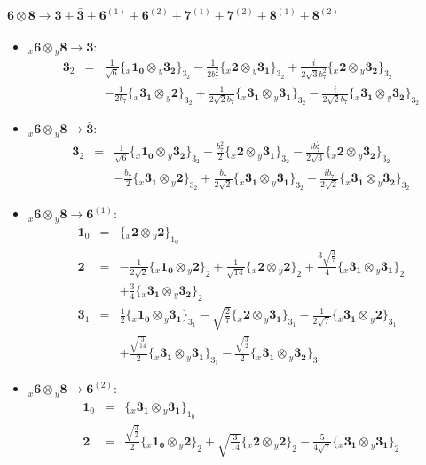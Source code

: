 \documentclass[english]{article}
\newcommand{\rep}[1]{\mathbf{#1}}
\newcommand{\repx}[2]{{}_{#2}\mathbf{#1}}
\newcommand{\subcg}[3]{\big\{ \repx{#1}{x}\otimes\repx{#2}{y}\big\}^{}_{#3}}
\begin{document}
\paragraph*{\Large $\rep{6}\otimes\rep{8}\to\rep{3}+\rep{\bar{3}}+\rep{6}^{(1)}+\rep{6}^{(2)}+\rep{7}^{(1)}+\rep{7}^{(2)}+\rep{8}^{(1)}+\rep{8}^{(2)}$}
\begin{itemize}
\item $\repx{6}{x}\otimes\repx{8}{y}\to\rep{3}$:
\begin{eqnarray*}
\rep{3}_{2} &=& \frac{1}{\sqrt{6}}\subcg{1_{0}}{3_{2}}{3_{2}}-\frac{1}{2 b_7^2}\subcg{2}{3_{1}}{3_{2}}+\frac{i}{2 \sqrt{3} b_7^2}\subcg{2}{3_{2}}{3_{2}} \\ 
 & & -\frac{1}{2 b_7}\subcg{3_{1}}{2}{3_{2}}+\frac{1}{2 \sqrt{2} b_7}\subcg{3_{1}}{3_{1}}{3_{2}}-\frac{i}{2 \sqrt{2} b_7}\subcg{3_{1}}{3_{2}}{3_{2}}
\end{eqnarray*}
\item $\repx{6}{x}\otimes\repx{8}{y}\to\rep{\bar{3}}$:
\begin{eqnarray*}
\rep{3}_{2} &=& \frac{1}{\sqrt{6}}\subcg{1_{0}}{3_{2}}{3_{2}}-\frac{b_7^2}{2}\subcg{2}{3_{1}}{3_{2}}-\frac{i b_7^2}{2 \sqrt{3}}\subcg{2}{3_{2}}{3_{2}} \\ 
 & & -\frac{b_7}{2}\subcg{3_{1}}{2}{3_{2}}+\frac{b_7}{2 \sqrt{2}}\subcg{3_{1}}{3_{1}}{3_{2}}+\frac{i b_7}{2 \sqrt{2}}\subcg{3_{1}}{3_{2}}{3_{2}}
\end{eqnarray*}
\item $\repx{6}{x}\otimes\repx{8}{y}\to\rep{6}^{(1)}$:
\begin{eqnarray*}
\rep{1}_{0} &=& \subcg{2}{2}{1_{0}}
\\
\rep{2} &=& -\frac{1}{2 \sqrt{2}}\subcg{1_{0}}{2}{2}+\frac{1}{\sqrt{14}}\subcg{2}{2}{2}+\frac{3 \sqrt{\frac{3}{7}}}{4}\subcg{3_{1}}{3_{1}}{2} \\ 
 & & +\frac{3}{4}\subcg{3_{1}}{3_{2}}{2}
\\
\rep{3}_{1} &=& \frac{1}{2}\subcg{1_{0}}{3_{1}}{3_{1}}-\sqrt{\frac{2}{7}}\subcg{2}{3_{1}}{3_{1}}-\frac{1}{2 \sqrt{7}}\subcg{3_{1}}{2}{3_{1}} \\ 
 & & +\frac{\sqrt{\frac{3}{14}}}{2}\subcg{3_{1}}{3_{1}}{3_{1}}-\frac{\sqrt{\frac{3}{2}}}{2}\subcg{3_{1}}{3_{2}}{3_{1}}
\end{eqnarray*}
\item $\repx{6}{x}\otimes\repx{8}{y}\to\rep{6}^{(2)}$:
\begin{eqnarray*}
\rep{1}_{0} &=& \subcg{3_{1}}{3_{1}}{1_{0}}
\\
\rep{2} &=& \frac{\sqrt{\frac{3}{2}}}{2}\subcg{1_{0}}{2}{2}+\sqrt{\frac{3}{14}}\subcg{2}{2}{2}-\frac{5}{4 \sqrt{7}}\subcg{3_{1}}{3_{1}}{2} \\ 

\end{eqnarray*}
\end{itemize}
\end{document}
